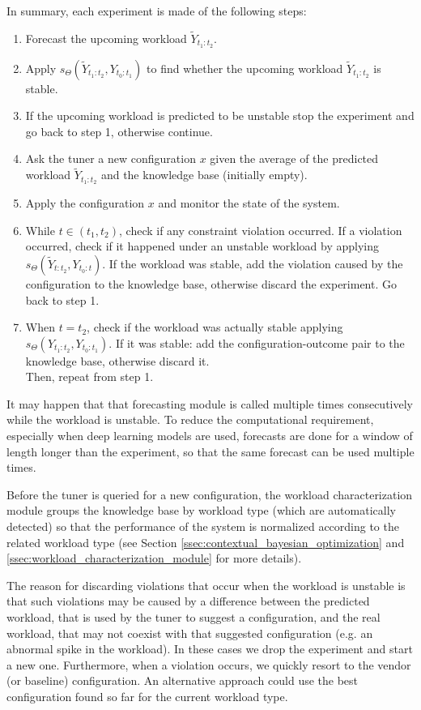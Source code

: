 \documentclass[a4paper, 12pt]{article} %
\begin{document}
	 In summary, each experiment is made of the following steps: 
	\begin{enumerate}
		\item Forecast the upcoming workload $\tilde{Y}_{t_1:t_2}$.
		\item Apply $s_\Theta(\tilde{Y}_{t_1:t_2}, Y_{t_0:t_1})$ to find whether the upcoming workload $\tilde{Y}_{t_1:t_2}$ is stable.
		\item If the upcoming workload is predicted to be unstable stop the experiment and go back to step 1, otherwise continue.
		\item Ask the tuner a new configuration $x$ given the average of the predicted workload $\tilde{Y}_{t_1:t_2}$ and the knowledge base (initially empty).
		\item Apply the configuration $x$ and monitor the state of the system.
		\item While $t \in (t_1, t_2)$, check if any constraint violation occurred. If a violation occurred, check if it happened under an unstable workload by applying $s_\Theta(\tilde{Y}_{t:t_2}, Y_{t_0:t})$. If the workload was stable, add the violation caused by the configuration to the knowledge base, otherwise discard the experiment. Go back to step 1.
		\item When $t=t_2$, check if the workload was actually stable applying\\ $s_\Theta(Y_{t_1:t_2}, Y_{t_0:t_1})$.  If it was stable: add the configuration-outcome pair to the knowledge base, otherwise discard it.\\
				  Then, repeat from step 1.
	\end{enumerate}
	It may happen that that forecasting module is called multiple times consecutively while the workload is unstable. To reduce the computational requirement, especially when deep learning models are used, forecasts are done for a window of length longer than the experiment, so that the same forecast can be used multiple times.
	
	Before the tuner is queried for a new configuration, the workload characterization module groups the knowledge base by workload type (which are automatically detected) so that the performance of the system is normalized according to the related workload type (see Section \ref{ssec:contextual_bayesian_optimization} and \ref{ssec:workload_characterization_module} for more details).
	
	The reason for discarding violations that occur when the workload is unstable is that such violations may be caused by a difference between the predicted workload, that is used by the tuner to suggest a configuration, and the real workload, that may not coexist with that suggested configuration (e.g. an abnormal spike in the workload). In these cases we drop the experiment and start a new one. 
	Furthermore, when a violation occurs, we quickly resort to the vendor (or baseline) configuration. An alternative approach could use the best configuration found so far for the current workload type.
	
\end{document}
